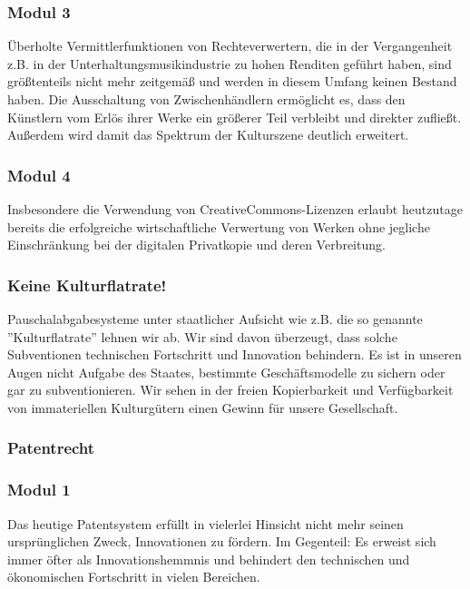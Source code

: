 \subsubsection{Modul 3}
\abstimmung
Überholte Vermittlerfunktionen von Rechteverwertern, die in der Vergangenheit z.B. in der Unterhaltungsmusikindustrie zu hohen Renditen geführt haben, sind größtenteils nicht mehr zeitgemäß und werden in diesem Umfang keinen Bestand haben. Die Ausschaltung von Zwischenhändlern ermöglicht es, dass den Künstlern vom Erlös ihrer Werke ein größerer Teil verbleibt und direkter zufließt. Außerdem wird damit das Spektrum der Kulturszene deutlich erweitert.

\subsubsection{Modul 4}
\abstimmung
Insbesondere die Verwendung von CreativeCommons-Lizenzen erlaubt heutzutage bereits die erfolgreiche wirtschaftliche Verwertung von Werken ohne jegliche Einschränkung bei der digitalen Privatkopie und deren Verbreitung.
 

\subsubsection{Keine Kulturflatrate!}
\abstimmung
Pauschalabgabesysteme unter staatlicher Aufsicht wie z.B. die so genannte ''Kulturflatrate'' lehnen wir ab. Wir sind davon überzeugt, dass solche Subventionen technischen Fortschritt und Innovation behindern. Es ist in unseren Augen nicht Aufgabe des Staates, bestimmte Geschäftsmodelle zu sichern oder gar zu subventionieren. Wir sehen in der freien Kopierbarkeit und Verfügbarkeit von immateriellen Kulturgütern einen Gewinn für unsere Gesellschaft.
 
\subsubsection{Patentrecht}
\label{wp:ip:patent1}

\subsubsection{Modul 1}
\abstimmung
Das heutige Patentsystem erfüllt in vielerlei Hinsicht nicht mehr seinen ursprünglichen Zweck, Innovationen zu fördern. Im Gegenteil: Es erweist sich immer öfter als Innovationshemmnis und behindert den technischen und ökonomischen Fortschritt in vielen Bereichen.

